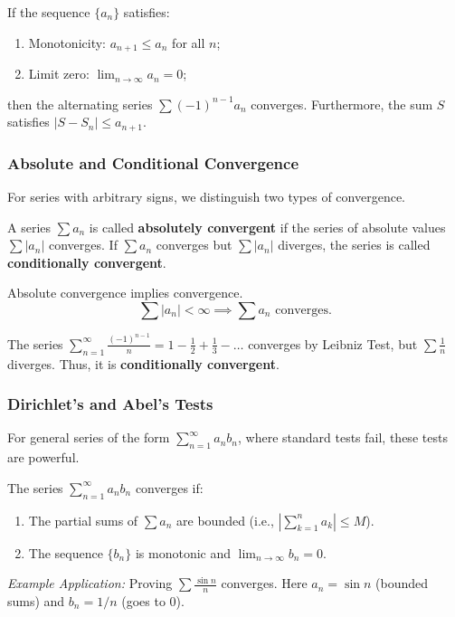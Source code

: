 \begin{theorem}
If the sequence $\{a_n\}$ satisfies:
\begin{enumerate}
    \item Monotonicity: $a_{n+1} \le a_n$ for all $n$;
    \item Limit zero: $\lim_{n \to \infty} a_n = 0$;
\end{enumerate}
then the alternating series $\sum (-1)^{n-1} a_n$ converges.
Furthermore, the sum $S$ satisfies $|S - S_n| \le a_{n+1}$.
\end{theorem}

\subsubsection{Absolute and Conditional Convergence}
For series with arbitrary signs, we distinguish two types of convergence.

\begin{definition}
A series $\sum a_n$ is called \textbf{absolutely convergent} if the series of absolute values $\sum |a_n|$ converges.
If $\sum a_n$ converges but $\sum |a_n|$ diverges, the series is called \textbf{conditionally convergent}.
\end{definition}

\begin{theorem}
Absolute convergence implies convergence.
\[ \sum |a_n| < \infty \implies \sum a_n \text{ converges}. \]
\end{theorem}

\begin{example}
The series $\sum_{n=1}^{\infty} \frac{(-1)^{n-1}}{n} = 1 - \frac{1}{2} + \frac{1}{3} - \dots$ converges by Leibniz Test, but $\sum \frac{1}{n}$ diverges. Thus, it is \textbf{conditionally convergent}.
\end{example}

\subsubsection{Dirichlet's and Abel's Tests}
For general series of the form $\sum_{n=1}^{\infty} a_n b_n$, where standard tests fail, these tests are powerful.

\begin{theorem}
The series $\sum_{n=1}^{\infty} a_n b_n$ converges if:
\begin{enumerate}
    \item The partial sums of $\sum a_n$ are bounded (i.e., $|\sum_{k=1}^n a_k| \le M$).
    \item The sequence $\{b_n\}$ is monotonic and $\lim_{n \to \infty} b_n = 0$.
\end{enumerate}
\end{theorem}
\textit{Example Application:} Proving $\sum \frac{\sin n}{n}$ converges. Here $a_n = \sin n$ (bounded sums) and $b_n = 1/n$ (goes to 0).

